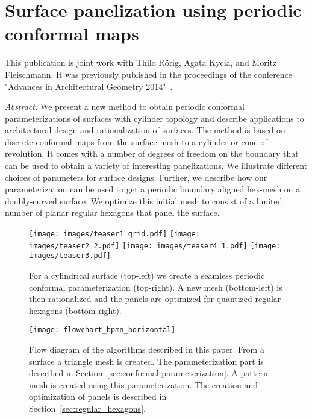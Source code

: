 \documentclass[Thesis.tex]{subfiles}
\begin{document}
\chapter{Surface panelization using periodic conformal maps}
\label{chp:periodic_conformal_maps}

This publication is joint work with Thilo R\"orig, Agata Kycia, and 
Moritz Fleischmann. It was previously published in the proceedings of the conference "Advances in Architectural Geometry 2014"~\cite{Roerig2014}.

\emph{Abstract:} 
We present a new method to obtain periodic conformal parameterizations of
surfaces with cylinder topology and describe applications to
architectural design and rationalization of surfaces. The method is
based on discrete conformal maps from the surface mesh to a cylinder or
cone of revolution. It comes with a number of degrees of freedom on
the boundary that can be used to obtain a variety of interesting
panelizations. We illustrate different choices of parameters for
\nurbs surface designs. Further, we describe how our parameterization
can be used to get a periodic boundary aligned hex-mesh on a
doubly-curved surface. We optimize this initial mesh to consist of a
limited number of planar regular hexagons that panel the surface.

\begin{figure}
  \centering
  \texttt{[image: images/teaser1\_grid.pdf]}
  \texttt{[image: images/teaser2\_2.pdf]}
  \texttt{[image: images/teaser4\_1.pdf]}
  \texttt{[image: images/teaser3.pdf]}
  \caption{For a cylindrical \nurbs surface (top-left) we create a
    seamless periodic conformal parameterization (top-right). A new
    mesh (bottom-left) is then rationalized and the panels are
    optimized for quantized regular hexagons (bottom-right).}
  \label{fig:teaser2}
\end{figure}

\def\subfilebibliography{}


\begin{figure}[tb]
\centering
\texttt{[image: flowchart\_bpmn\_horizontal]}
\caption{Flow diagram of the algorithms described in this paper. From
  a \nurbs surface a triangle mesh is created. The parameterization
  part is described in Section~\ref{sec:conformal-parameterization}. A
  pattern-mesh is created using this parameterization. The creation
  and optimization of panels is described in
  Section~\ref{sec:regular_hexagons}.}
\label{fig:algorithm_diagram}
\end{figure}
\end{document}
